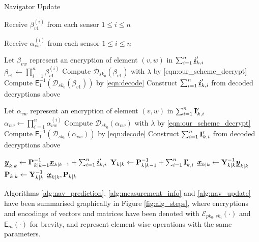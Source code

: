 \documentclass[10pt,journal,compsoc]{IEEEtran}
\theoremstyle{definition}
\theoremstyle{definition}
\theoremstyle{remark}
\begin{document}
\begin{algorithm}[htbp]
\caption{Navigator Update}\label{alg:nav_update}
\begin{algorithmic}[1]
    
        \State Receive $\beta_{v1}^{(i)}$ from each sensor $1\leq i \leq n$
    \EndFor

        \State Receive $\alpha_{vw}^{(i)}$ from each sensor $1\leq i \leq n$
        \EndFor
    \EndFor

    \State Let $\beta_{vw}$ represent an encryption of element $(v,w)$ in $\sum_{i=1}^n{\boldsymbol{\underline{i}}}'_{k,i}$
        \State $\beta_{v1} \gets \prod_{i=1}^n\beta_{v1}^{(i)}$
        \State Compute $\mathcal{D}_{sk_0}(\beta_{v1})$ with $\lambda$ by \eqref{eqn:our_scheme_decrypt}
        \State Compute $\mathsf{E}^{-1}_{1}(\mathcal{D}_{sk_0}(\beta_{v1}))$ by \eqref{eqn:decode}
    \EndFor
    \State Construct $\sum_{i=1}^n{\boldsymbol{\underline{i}}}'_{k,i}$ from decoded decryptions above

    \State Let $\alpha_{vw}$ represent an encryption of element $(v,w)$ in $\sum_{i=1}^n{{\mathbf{I}}}'_{k,i}$
            \State $\alpha_{vw} \gets \prod_{i=1}^n\alpha_{vw}^{(i)}$
            \State Compute $\mathcal{D}_{sk_0}(\alpha_{vw})$ with $\lambda$ by \eqref{eqn:our_scheme_decrypt}
            \State Compute $\mathsf{E}^{-1}_{1}(\mathcal{D}_{sk_0}(\alpha_{vw}))$ by \eqref{eqn:decode}
        \EndFor
    \EndFor
    \State Construct $\sum_{i=1}^n{{\mathbf{I}}}'_{k,i}$ from decoded decryptions above

    \State ${\boldsymbol{\underline{y}}}_{k|k} \gets {\ensuremath{{\mathbf{P}}}}_{k|k-1}^{-1}{\boldsymbol{\underline{x}}}_{k|k-1} + \sum_{i=1}^n{\boldsymbol{\underline{i}}}'_{k,i}$
    \State ${{\mathbf{Y}}}_{k|k} \gets {\ensuremath{{\mathbf{P}}}}_{k|k-1}^{-1} + \sum_{i=1}^n{{\mathbf{I}}}'_{k,i}$
    \State ${\boldsymbol{\underline{x}}}_{k|k} \gets {\ensuremath{{\mathbf{Y}}}}_{k|k}^{-1}{\boldsymbol{\underline{y}}}_{k|k}$
    \State ${{\mathbf{P}}}_{k|k} \gets {\ensuremath{{\mathbf{Y}}}}_{k|k}^{-1}$
    \State \Return ${\boldsymbol{\underline{x}}}_{k|k}, {{\mathbf{P}}}_{k|k}$
    \EndProcedure
\end{algorithmic}
\end{algorithm}

Algorithms \ref{alg:nav_prediction}, \ref{alg:measurement_info} and \ref{alg:nav_update} have been summarised graphically in Figure \ref{fig:alg_steps}, where encryptions and encodings of vectors and matrices have been denoted with $\mathcal{E}_{pk_0,sk_i}(\cdot)$ and $\mathsf{E}_m(\cdot)$ for brevity, and represent element-wise operations with the same parameters.
\end{document}
